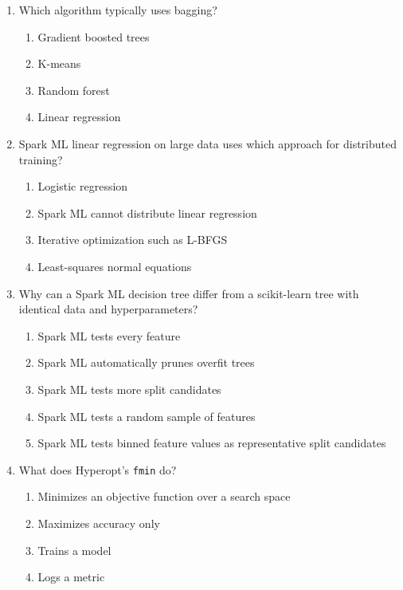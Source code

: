 \documentclass[11pt]{article}
\begin{document}
	\begin{enumerate}[leftmargin=*, label=\textbf{Q\arabic*.}, start=58]
		
		\item Which algorithm typically uses bagging?
		\begin{enumerate}[label=(\alph*)]
			\item Gradient boosted trees
			\item K-means
			\item Random forest
			\item Linear regression
		\end{enumerate}
		
		\item Spark ML linear regression on large data uses which approach for distributed training?
		\begin{enumerate}[label=(\alph*)]
			\item Logistic regression
			\item Spark ML cannot distribute linear regression
			\item Iterative optimization such as L-BFGS
			\item Least-squares normal equations
		\end{enumerate}
		
		\item Why can a Spark ML decision tree differ from a scikit-learn tree with identical data and hyperparameters?
		\begin{enumerate}[label=(\alph*)]
			\item Spark ML tests every feature
			\item Spark ML automatically prunes overfit trees
			\item Spark ML tests more split candidates
			\item Spark ML tests a random sample of features
			\item Spark ML tests binned feature values as representative split candidates
		\end{enumerate}
		
		\item What does Hyperopt's \texttt{fmin} do?
		\begin{enumerate}[label=(\alph*)]
			\item Minimizes an objective function over a search space
			\item Maximizes accuracy only
			\item Trains a model
			\item Logs a metric
		\end{enumerate}
		

\end{enumerate}
\end{document}

